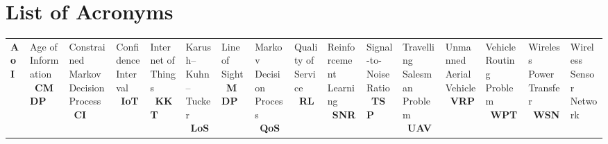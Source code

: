 \chapter*{List of Acronyms}

\begin{table}[!h]
\centering
\begin{tabular}{ll}
\textbf{AoI} & Age of Information \
\textbf{CMDP} & Constrained Markov Decision Process \
\textbf{CI} & Confidence Interval \
\textbf{IoT} & Internet of Things \
\textbf{KKT} & Karush--Kuhn--Tucker \
\textbf{LoS} & Line of Sight \
\textbf{MDP} & Markov Decision Process \
\textbf{QoS} & Quality of Service \
\textbf{RL} & Reinforcement Learning \
\textbf{SNR} & Signal-to-Noise Ratio \
\textbf{TSP} & Travelling Salesman Problem \
\textbf{UAV} & Unmanned Aerial Vehicle \
\textbf{VRP} & Vehicle Routing Problem \
\textbf{WPT} & Wireless Power Transfer \
\textbf{WSN} & Wireless Sensor Network \
\end{tabular}
\end{table}
